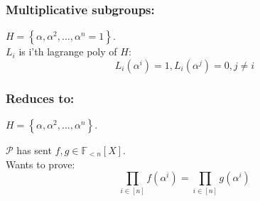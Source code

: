 \documentclass[shadesubsections,compress,14pt,mathserif]{beamer}
\newcommand{\prot}{\mathbf{P}}
\newcommand{\aggdeg}[1]{\mathfrak{d}(#1)}
\newcommand{\F}{\ensuremath{\mathbb F}}
\newcommand{\set}[1]{\ensuremath{\left\{#1\right\}}}
\newcommand{\sett}[2]{\ensuremath{\left\{#1\right\}_{#2}}}
\newcommand{\ver}{\ensuremath{\mathcal{V}}}
\newcommand{\prv}{\ensuremath{\mathcal{P}}}
\newcommand{\polysofdeg}[1]{\F_{< #1}[X]}
\newcommand{\ideal}{\mathbf{I}}
\newcommand{\gen}{\alpha}
\begin{document}
\begin{frame}
\frametitle{Multiplicative subgroups:}   %
 $H=\set{\gen,\gen^2,\ldots,\gen^n=1}$.\\
 \vspace{0.2in}
 $L_i$ is i'th lagrange poly of $H$:
 \[L_i(\alpha^i)=1,L_i(\alpha^j) =0, j\neq i\]
\end{frame}


\begin{frame}
\frametitle{Reduces to:}   %
 $H=\set{\gen,\gen^2,\ldots,\gen^n}$.\\
 \vspace{0.2in}
 
 $\prv$ has sent $f,g\in \polysofdeg{n}$.\\
 \vspace{0.2in}
 Wants to prove:
 \[\prod_{i\in [n]}  f(\gen^i) = \prod_{i\in [n]} g(\gen^i)\]

 

\end{frame}
% 
% 
% 
\end{document}
